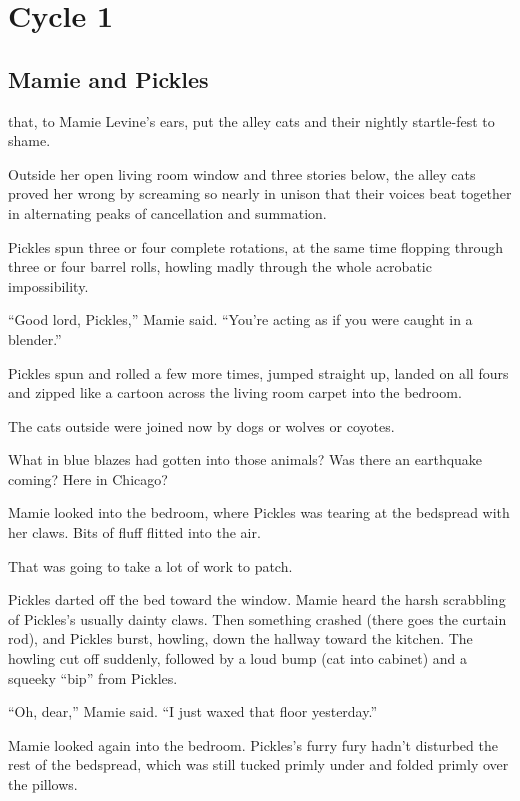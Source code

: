 \part{Cycle 1}

\chapter{Mamie and Pickles}

 that, to Mamie Levine's ears, put the alley cats and their nightly startle-fest to shame.

Outside her open living room window and three stories below, the alley cats proved her wrong by screaming so nearly in unison that their voices beat together in alternating peaks of cancellation and summation.

Pickles spun three or four complete rotations, at the same time flopping through three or four barrel rolls, howling madly through the whole acrobatic impossibility.

``Good lord, Pickles,'' Mamie said. ``You're acting as if you were caught in a blender.''

Pickles spun and rolled a few more times, jumped straight up, landed on all fours and zipped like a cartoon across the living room carpet into the bedroom.

The cats outside were joined now by dogs or wolves or coyotes.

What in blue blazes had gotten into those animals? Was there an earthquake coming? Here in Chicago?

Mamie looked into the bedroom, where Pickles was tearing at the bedspread with her claws. Bits of fluff flitted into the air.

That was going to take a lot of work to patch.

Pickles darted off the bed toward the window. Mamie heard the harsh scrabbling of Pickles's usually dainty claws. Then something crashed (there goes the curtain rod), and Pickles burst, howling, down the hallway toward the kitchen. The howling cut off suddenly, followed by a loud bump (cat into cabinet) and a squeeky ``bip'' from Pickles.

``Oh, dear,'' Mamie said. ``I just waxed that floor yesterday.''

Mamie looked again into the bedroom. Pickles's furry fury hadn't disturbed the rest of the bedspread, which was still tucked primly under and folded primly over the pillows.

